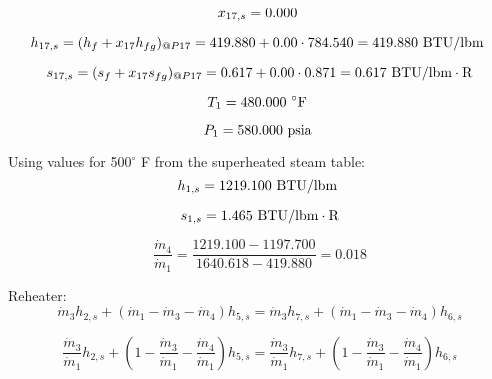 \documentclass{article}
\begin{document}
\begin{equation}
  x_{17,s} =    0.000\textnormal{                           }
\end{equation}

\begin{equation}
  h_{17,s} = (h_{f} + x_{17}h_{fg})_{@P17} =  419.880 + 0.00\cdot 784.540 =  419.880
\textnormal{ BTU/lbm                   }
\end{equation}

\begin{equation}
  s_{17,s} = (s_{f} + x_{17}s_{fg})_{@P17} =    0.617 + 0.00\cdot   0.871 =    0.617
\textnormal{ BTU/lbm}\cdot\textnormal{R}
\end{equation}

\begin{equation}
T_{ 1} =  480.000\textnormal{ \(^{\circ}\)F             }
\end{equation}

\begin{equation}
P_{ 1} =  580.000\textnormal{ psia                      }
\end{equation}


Using values for 500\(^{\circ}\) F from the superheated steam table:
\begin{equation}
  h_{ 1,s} = 1219.100\textnormal{ BTU/lbm                   }
\end{equation}

\begin{equation}
  s_{ 1,s} =    1.465\textnormal{ BTU/lbm}\cdot\textnormal{R}
\end{equation}

\begin{equation}
\frac{\dot{m}_{4}}{\dot{m}_{1}} = \frac{1219.100 - 1197.700}{1640.618 -  419.880} =    0.018
\end{equation}


Reheater:
\begin{equation}
\dot{m}_{ 3}h_{ 2,s} + (\dot{m}_{ 1} - \dot{m}_{ 3} - \dot{m}_{ 4})h_{ 5,s} = \dot{m}_{ 3}h_{ 7,s} + (\dot{m}_{ 1} - \dot{m}_{ 3} - \dot{m}_{ 4})h_{ 6,s}
\end{equation}

\begin{equation}
\frac{\dot{m}_{ 3}}{\dot{m}_{ 1}}h_{ 2,s} + (1 - \frac{\dot{m}_{ 3}}{\dot{m}_{ 1}} - \frac{\dot{m}_{ 4}}{\dot{m}_{ 1}})h_{ 5,s} = \frac{\dot{m}_{ 3}}{\dot{m}_{ 1}}h_{ 7,s} + (1 - \frac{\dot{m}_{ 3}}{\dot{m}_{ 1}} - \frac{\dot{m}_{ 4}}{\dot{m}_{ 1}})h_{ 6,s}
\end{equation}
\end{document}
